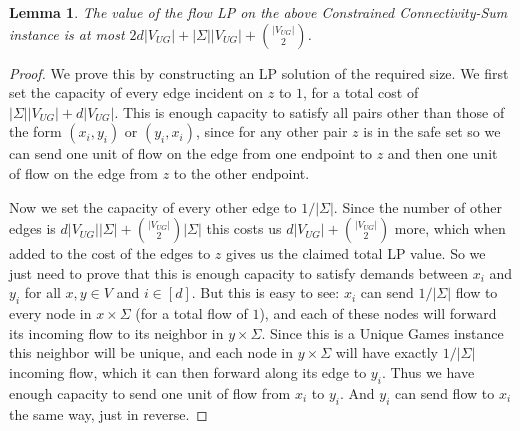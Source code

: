 \documentclass[11pt,letterpaper]{article}
\newtheorem{lemma}[theorem]{Lemma}
\theoremstyle{definition}
\begin{document}
  \begin{lemma} \label{lem:LP_gap} The value of the flow LP on the
    above {\sc Constrained Connectivity-Sum} instance is at most $2d|V_{UG}| +
    |\Sigma||V_{UG}| + {|V_{UG}| \choose 2}$.
  \end{lemma}
  \begin{proof}
    We prove this by constructing an LP solution of the required size.
    We first set the capacity of every edge incident on $z$ to $1$,
    for a total cost of $|\Sigma||V_{UG}| + d|V_{UG}|$.  This is
    enough capacity to satisfy all pairs other than those of the form
    $(x_i, y_i)$ or $(y_i, x_i)$, since for any other pair $z$ is in
    the safe set so we can send one unit of flow on the edge from one
    endpoint to $z$ and then one unit of flow on the edge from $z$ to
    the other endpoint.

    Now we set the capacity of every other edge to $1/|\Sigma|$.
    Since the number of other edges is $d|V_{UG}||\Sigma| + {|V_{UG}|
      \choose 2} |\Sigma|$ this costs us $d|V_{UG}| + {|V_{UG}|
      \choose 2}$ more, which when added to the cost of the edges to
    $z$ gives us the claimed total LP value.  So we just need to prove
    that this is enough capacity to satisfy demands between $x_i$ and
    $y_i$ for all $x,y \in V$ and $i \in [d]$.  But this is easy to
    see: $x_i$ can send $1/|\Sigma|$ flow to every node in $x \times
    \Sigma$ (for a total flow of $1$), and each of these nodes will
    forward its incoming flow to its neighbor in $y \times \Sigma$.
    Since this is a Unique Games instance this neighbor will be
    unique, and each node in $y \times \Sigma$ will have exactly $1 /
    |\Sigma|$ incoming flow, which it can then forward along its edge
    to $y_i$.  Thus we have enough capacity to send one unit of flow
    from $x_i$ to $y_i$.  And $y_i$ can send flow to $x_i$ the same
    way, just in reverse.
  \end{proof}
\end{document}
